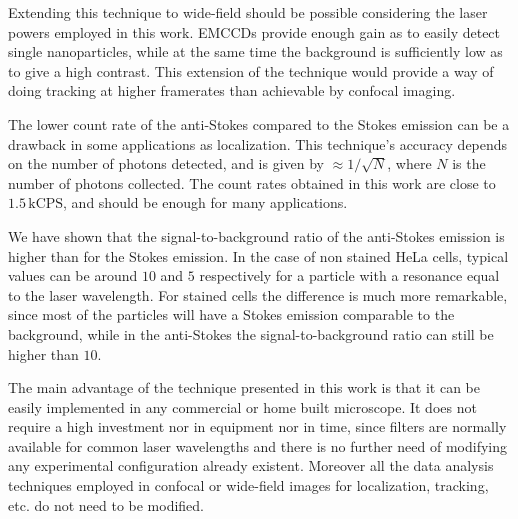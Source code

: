 \documentclass[journal=nalefd,manuscript=letter]{achemso}
\begin{document}
Extending this technique to wide-field should be possible considering the laser
powers employed in this work. EMCCDs provide enough gain as to easily detect
single nanoparticles, while at the same time the background is sufficiently low
as to give a high contrast. This extension of the technique would provide a way
of doing tracking at higher framerates than achievable by confocal imaging.

The lower count rate of the anti-Stokes compared to the Stokes emission can be a
drawback in some applications as localization. This technique's accuracy depends 
on the number of photons detected, and is given by $\approx
1/\sqrt{N}$, where $N$ is the number of photons collected. The count rates
obtained in this work are close to $1.5\,\textrm{kCPS}$, and should be enough
for many applications. 

We have shown that the signal-to-background ratio of the anti-Stokes emission is
higher than for the Stokes emission. In the case of non stained HeLa cells,
typical values can be around $10$ and $5$ respectively for a particle with a
resonance equal to the laser wavelength. For stained cells the difference is
much more remarkable, since most of the particles will have a Stokes emission
comparable to the background, while in the anti-Stokes the signal-to-background
ratio can still be higher than $10$.

The main advantage of the technique presented in this work is that it can be
easily implemented in any commercial or home built microscope. It does not
require a high investment nor in equipment nor in time, since filters are
normally available for common laser wavelengths and there is no further need of
modifying any experimental configuration already existent. Moreover all the data
analysis techniques employed in confocal or wide-field images for localization,
tracking, etc. do not need to be modified. 


{}
\end{document}
